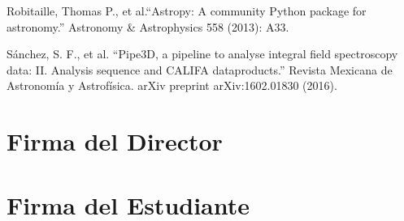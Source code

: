 \documentclass[12pt]{article}
\begin{document}
\begin{thebibliography}{10}

 Robitaille, Thomas P., et al.``Astropy: A community Python
 package for astronomy.'' Astronomy \& Astrophysics 558 (2013): A33.


 S\'anchez, S. F., et al. ``Pipe3D, a pipeline to analyse integral
 field spectroscopy data: II. Analysis sequence and CALIFA dataproducts.'' Revista Mexicana de Astronom\'ia y Astrof\'isica.
 arXiv preprint arXiv:1602.01830 (2016).

\end{thebibliography}

\section*{Firma del Director}
\vspace{1.5cm}

\section*{Firma del Estudiante	}
\end{document}
